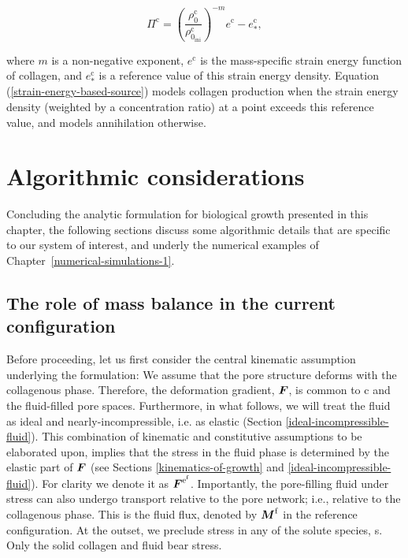 \begin{equation}
\Pi^\mathrm{c} = \left( \frac{\rho^\mathrm{c}_0}
   {\rho^\mathrm{c}_{0_\mathrm{ini}}} \right)^{-m}
   e^{\mathrm{c}}-e^{\mathrm{c}}_*,
\label{strain-energy-based-source}
\end{equation}

\noindent where $m$ is a non-negative exponent, $e^{\mathrm{c}}$ is
the mass-specific strain energy function of collagen, and
$e^{\mathrm{c}}_*$ is a reference value of this strain energy
density. Equation (\ref{strain-energy-based-source}) models collagen
production when the strain energy density (weighted by a concentration
ratio) at a point exceeds this reference value, and models
annihilation otherwise.

\section{Algorithmic considerations}
\label{algorithmic-considerations}

Concluding the analytic formulation for biological growth presented in
this chapter, the following sections discuss some algorithmic details
that are specific to our system of interest, and underly the numerical
examples of Chapter~\ref{numerical-simulations-1}.

\subsection{The role of mass balance in the current
  configuration}
\label{role-of-current-mass-balance}

Before proceeding, let us first consider the central kinematic
assumption underlying the formulation: We assume that the pore
structure deforms with the collagenous phase. Therefore, the
deformation gradient, $\mbox{\boldmath$ F$}$, is common to c and the fluid-filled pore
spaces. Furthermore, in what follows, we will treat the fluid as ideal
and nearly-incompressible, i.e. as elastic (Section
\ref{ideal-incompressible-fluid}). This combination of kinematic and
constitutive assumptions to be elaborated upon, implies that the
stress in the fluid phase is determined by the elastic part of $\mbox{\boldmath$ F$}$
(see Sections \ref{kinematics-of-growth} and
\ref{ideal-incompressible-fluid}). For clarity we denote it as
$\mbox{\boldmath$ F$}^{\mathrm{e}^\mathrm{f}}$. Importantly, the pore-filling fluid
under stress can also undergo transport relative to the pore network;
i.e., relative to the collagenous phase. This is the fluid flux,
denoted by $\mbox{\boldmath$ M$}^\mathrm{f}$ in the reference configuration. At the
outset, we preclude stress in any of the solute species, s. Only the
solid collagen and fluid bear stress.

